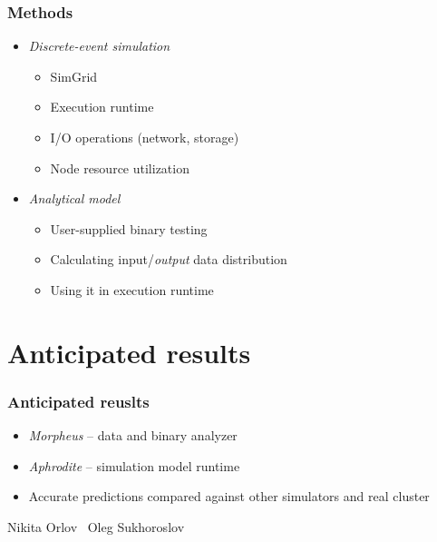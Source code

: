 \documentclass{beamer}
\begin{document}
    \begin{frame}
        \frametitle{Methods}
        \begin{itemize}
            \item<+-> \textit{Discrete-event simulation}
            \begin{itemize}
                \item<+-> SimGrid
                \item<+-> Execution runtime
                \item<+-> I/O operations (network, storage)
                \item<+-> Node resource utilization
            \end{itemize}
            \item<+-> \textit{Analytical model}
            \begin{itemize}
                \item<+-> User-supplied binary testing
                \item<+-> Calculating input/\textit{output} data distribution
                \item<+-> Using it in execution runtime
            \end{itemize}
        \end{itemize}
    \end{frame}

    \section{Anticipated results}
    
    \begin{frame}
        \frametitle{Anticipated reuslts}
        \begin{itemize}
            \item<+-> \textit{Morpheus} --  data and binary analyzer
            \item<+-> \textit{Aphrodite} -- simulation model runtime
            \item<+-> Accurate predictions compared against other simulators 
                and real cluster
        \end{itemize}
    \end{frame}

    \begin{frame}
        \begin{center}
            Nikita Orlov
            \
            Oleg Sukhoroslov
        \end{center}
    \end{frame}
\end{document}
